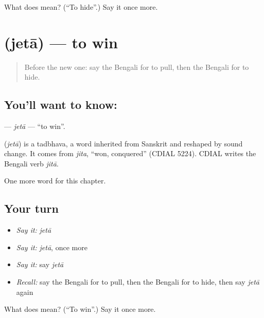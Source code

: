 \begin{tcolorbox}[breakable,colback=teal!4,colframe=teal!35!black,title={Before you move on}]
What does  mean? (\textquotedblleft{}To hide\textquotedblright{}.) Say it once more.
\end{tcolorbox}
\section[\texorpdfstring{\bn{জেতা} (jetā)}{জেতা (jetā)}]{ (jetā) — to win}

\label{lesson:BN-C54-jeta}



\begin{quote}
Before the new one: say the Bengali for to pull, then the Bengali for to hide.
\end{quote}

\subsection*{You'll want to know: }
\textbf{} — \emph{jetā} — \textquotedblleft{}to win\textquotedblright{}.

\begin{cousinweb}
\textbf{} (\emph{jetā}) is a tadbhava, a word inherited from Sanskrit and reshaped by sound change. It comes from \emph{jita}, \textquotedblleft{}won, conquered\textquotedblright{} (CDIAL 5224). CDIAL writes the Bengali verb \emph{jitā}.
\end{cousinweb}

\begin{grammarlens}[title={What you've built}]
One more word for this chapter.
\end{grammarlens}

\subsection*{Your turn}
\begin{itemize}
\raggedright
  \item \emph{Say it:} \emph{jetā}
  \item \emph{Say it:} \emph{jetā}, once more
  \item \emph{Say it:} say \emph{jetā}
  \item \emph{Recall:} say the Bengali for to pull, then the Bengali for to hide, then say \emph{jetā} again
\end{itemize}

\begin{tcolorbox}[breakable,colback=teal!4,colframe=teal!35!black,title={Before you move on}]
What does  mean? (\textquotedblleft{}To win\textquotedblright{}.) Say it once more.
\end{tcolorbox}
